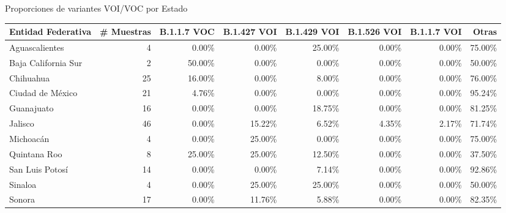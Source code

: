 \documentclass[12pt]{standalone}
\begin{document}
\bigskip
\centering
Proporciones de variantes VOI/VOC por Estado
\begin{table}[ht]
\centering
\begin{tabular}{lrrrrrrr}
  \toprule
{\textbf{Entidad Federativa}} & {\textbf{\# Muestras}} & {\textbf{B.1.1.7 VOC}} & {\textbf{B.1.427 VOI}} & {\textbf{B.1.429 VOI}} & {\textbf{B.1.526 VOI}} & {\textbf{B.1.1.7 VOI}} & {\textbf{Otras}} \\ 
  \midrule
Aguascalientes & 4 & 0.00\% & 0.00\% & 25.00\% & 0.00\% & 0.00\% & 75.00\% \\ 
  Baja California Sur & 2 & 50.00\% & 0.00\% & 0.00\% & 0.00\% & 0.00\% & 50.00\% \\ 
  Chihuahua & 25 & 16.00\% & 0.00\% & 8.00\% & 0.00\% & 0.00\% & 76.00\% \\ 
  Ciudad de México & 21 & 4.76\% & 0.00\% & 0.00\% & 0.00\% & 0.00\% & 95.24\% \\ 
  Guanajuato & 16 & 0.00\% & 0.00\% & 18.75\% & 0.00\% & 0.00\% & 81.25\% \\ 
  Jalisco & 46 & 0.00\% & 15.22\% & 6.52\% & 4.35\% & 2.17\% & 71.74\% \\ 
  Michoacán & 4 & 0.00\% & 25.00\% & 0.00\% & 0.00\% & 0.00\% & 75.00\% \\ 
  Quintana Roo & 8 & 25.00\% & 25.00\% & 12.50\% & 0.00\% & 0.00\% & 37.50\% \\ 
  San Luis Potosí & 14 & 0.00\% & 0.00\% & 7.14\% & 0.00\% & 0.00\% & 92.86\% \\ 
  Sinaloa & 4 & 0.00\% & 25.00\% & 25.00\% & 0.00\% & 0.00\% & 50.00\% \\ 
  Sonora & 17 & 0.00\% & 11.76\% & 5.88\% & 0.00\% & 0.00\% & 82.35\% \\ 
   \bottomrule
\end{tabular}
\end{table}

\bigskip
\endminipage
\end{document}
